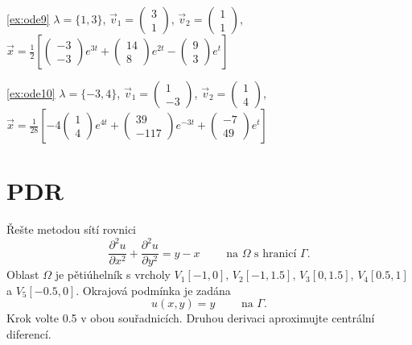 \documentclass[a4paper,10pt]{book}
\begin{document}
\ref{ex:ode9} $\lambda=\{1,3\}$, 
              $\vec{v}_1=\left(\begin{smallmatrix} 3\\ 1 \end{smallmatrix} \right)$, 
              $\vec{v}_2=\left(\begin{smallmatrix} 1\\ 1 \end{smallmatrix} \right)$, 
              $\vec{x}=\frac{1}{2}\left[\left(\begin{smallmatrix} -3\\ -3 \end{smallmatrix} \right)e^{3t}
               +\left(\begin{smallmatrix} 14\\ 8 \end{smallmatrix} \right)e^{2t}
               -\left(\begin{smallmatrix} 9\\ 3 \end{smallmatrix} \right)e^{t}\right]$   
               
\ref{ex:ode10} $\lambda=\{-3,4\}$, 
              $\vec{v}_1=\left(\begin{smallmatrix} 1\\ -3 \end{smallmatrix} \right)$, 
              $\vec{v}_2=\left(\begin{smallmatrix} 1\\ 4 \end{smallmatrix} \right)$, 
              $\vec{x}=\frac{1}{28}\left[-4\left(\begin{smallmatrix} 1\\ 4 \end{smallmatrix} \right)e^{4t}
               +\left(\begin{smallmatrix} 39\\ -117 \end{smallmatrix} \right)e^{-3t}
               +\left(\begin{smallmatrix} -7\\ 49 \end{smallmatrix} \right)e^{t}\right]$   




\chapter{PDR}

\exercise \label{ex:pde1} Řešte metodou sítí rovnici 
\begin{equation*}
\frac{\partial^2 u}{\partial x^2} + \frac{\partial^2 u}{\partial y^2} = y-x \qquad \textrm{ na } \Omega \textrm{ s hranicí } \Gamma.
\end{equation*}
Oblast $\Omega$ je pětiúhelník s vrcholy $V_1[-1,0],\,V_2[-1,1.5],\,V_3[0,1.5],\,V_4[0.5,1]$ a $V_5[-0.5,0]$. Okrajová podmínka je zadána
\begin{equation*}
u(x,y) = y \qquad \textrm{ na } \Gamma.
\end{equation*}
Krok volte 0.5 v obou souřadnicích. Druhou derivaci aproximujte centrální diferencí.
\end{document}
